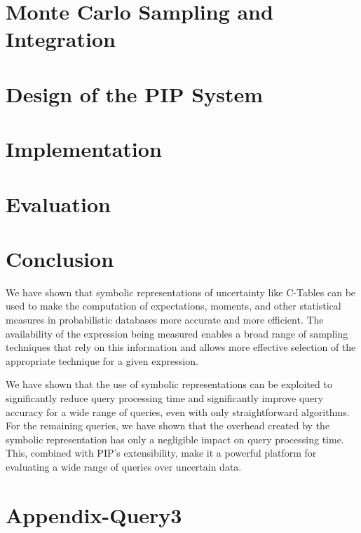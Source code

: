 \documentclass{vldb}
\begin{document}
\section{Monte Carlo Sampling and Integration}
\label{sec:sampling}


\section{Design of the PIP System}
\label{sec:design}


\section{Implementation}
\label{sec:implementation}


\section{Evaluation}
\label{sec:evaluation}



\section{Conclusion}

We have shown that symbolic representations of uncertainty like C-Tables can be used to make the computation of expectations, moments, and other statistical measures in probabilistic databases more accurate and more efficient.  The availability of the expression being measured enables a broad range of sampling techniques that rely on this information and allows more effective selection of the appropriate technique for a given expression.

We have shown that the use of symbolic representations can be exploited to significantly reduce query processing time and significantly improve query accuracy for a wide range of queries, even with only straightforward algorithms.  For the remaining queries, we have shown that the overhead created by the symbolic representation has only a negligible impact on query processing time.  This, combined with PIP's extensibility, make it a powerful platform for evaluating a wide range of queries over uncertain data.

\section{Appendix-Query3}
\label{sec:timingq3}


\begin{small}


\end{small}
\end{document}
